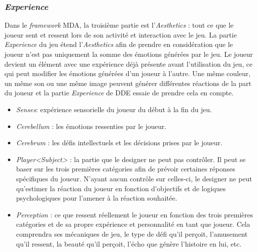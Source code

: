 \subsubsection*{\emph{Experience}}
    Dans le \emph{framework} MDA, la troisième partie est l'\emph{Aesthetics} : tout ce que le joueur sent et ressent lors de son activité et interaction avec le jeu. 
    La partie \emph{Experience} du jeu étend l'\emph{Aesthetics} afin de prendre en considération que le joueur n'est pas uniquement la somme des émotions générées par le jeu. 
    Le joueur devient un élément avec une expérience déjà présente avant l'utilisation du jeu, ce qui peut modifier les émotions générées d'un joueur à l'autre. Une même couleur, un même son ou une même image peuvent générer différentes réactions de la part du joueur et la partie \emph{Experience} de DDE essaie de prendre cela en compte.
    \begin{itemize}
        \item \emph{Senses}: expérience sensorielle du joueur du début à la fin du jeu.
        \item \emph{Cerebellum} : les émotions ressenties par le joueur.
        \item \emph{Cerebrum} : les d\'efis intellectuels et les décisions prises par le joueur.
        \item \emph{Player<Subject>} : la partie que le designer ne peut pas contrôler. Il peut se baser sur les trois premières catégories afin de prévoir certaines réponses spécifiques du joueur. N'ayant aucun contrôle sur celles-ci, le designer ne peut qu'estimer la réaction du joueur en fonction d'objectifs et de logiques psychologiques pour l'amener à la réaction souhaitée.
        \item \emph{Perception} : ce que ressent réellement le joueur en fonction des trois premières catégories et de sa propre expérience et personnalité en tant que joueur. Cela comprendra ses mécaniques de jeu, le type de d\'efi qu'il perçoit, l'amusement qu'il ressent, la beauté qu'il perçoit, l'écho que génère l'histoire en lui, etc.
    \end{itemize}


